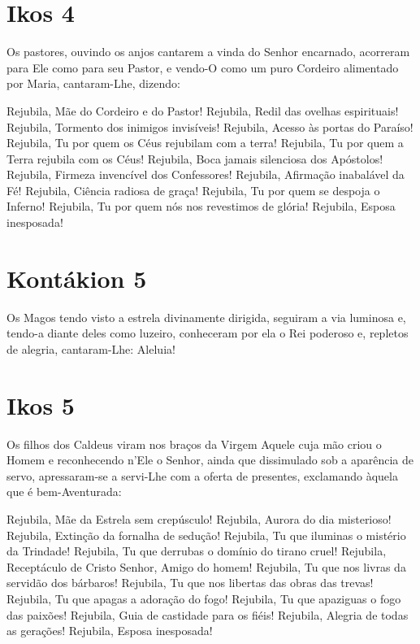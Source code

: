 \documentclass{subfiles}
\begin{document}
\section*{Ikos 4}

Os pastores, ouvindo os anjos cantarem a vinda do Senhor encarnado,
acorreram para Ele como para seu Pastor, e vendo-O como um puro Cordeiro
alimentado por Maria, cantaram-Lhe, dizendo:

Rejubila, Mãe do Cordeiro e do Pastor!
Rejubila, Redil das ovelhas espirituais!
Rejubila, Tormento dos inimigos invisíveis!
Rejubila, Acesso às portas do Paraíso!
Rejubila, Tu por quem os Céus rejubilam com a terra!
Rejubila, Tu por quem a Terra rejubila com os Céus!
Rejubila, Boca jamais silenciosa dos Apóstolos!
Rejubila, Firmeza invencível dos Confessores!
Rejubila, Afirmação inabalável da Fé!
Rejubila, Ciência radiosa de graça!
Rejubila, Tu por quem se despoja o Inferno!
Rejubila, Tu por quem nós nos revestimos de glória!
Rejubila, Esposa inesposada!

\section*{Kontákion 5}

Os Magos tendo visto a estrela divinamente dirigida, seguiram a via
luminosa e, tendo-a diante deles como luzeiro, conheceram por ela o Rei
poderoso e, repletos de alegria, cantaram-Lhe: Aleluia!

\section*{Ikos 5}

Os filhos dos Caldeus viram nos braços da Virgem Aquele cuja mão
criou o Homem e reconhecendo n'Ele o Senhor, ainda que dissimulado sob a
aparência de servo, apressaram-se a servi-Lhe com a oferta de presentes,
exclamando àquela que é bem-Aventurada:

Rejubila, Mãe da Estrela sem crepúsculo!
Rejubila, Aurora do dia misterioso!
Rejubila, Extinção da fornalha de sedução!
Rejubila, Tu que iluminas o mistério da Trindade!
Rejubila, Tu que derrubas o domínio do tirano cruel!
Rejubila, Receptáculo de Cristo Senhor, Amigo do homem!
Rejubila, Tu que nos livras da servidão dos bárbaros!
Rejubila, Tu que nos libertas das obras das trevas!
Rejubila, Tu que apagas a adoração do fogo!
Rejubila, Tu que apaziguas o fogo das paixões!
Rejubila, Guia de castidade para os fiéis!
Rejubila, Alegria de todas as gerações!
Rejubila, Esposa inesposada!
\end{document}
